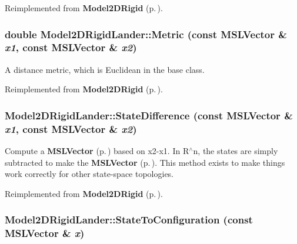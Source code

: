 Reimplemented from {\bf Model2DRigid} {\rm (p.\,\pageref{classModel2DRigid_a4})}.
\subsubsection{\setlength{\rightskip}{0pt plus 5cm}double Model2DRigid\-Lander::Metric (const {\bf MSLVector} \& {\em x1}, const {\bf MSLVector} \& {\em x2})\hspace{0.3cm}{\tt  [virtual]}}\label{classModel2DRigidLander_a7}


A distance metric, which is Euclidean in the base class.



Reimplemented from {\bf Model2DRigid} {\rm (p.\,\pageref{classModel2DRigid_a6})}.
\subsubsection{ Model2DRigid\-Lander::State\-Difference (const {\bf MSLVector} \& {\em x1}, const {\bf MSLVector} \& {\em x2})\hspace{0.3cm}{\tt  [virtual]}}\label{classModel2DRigidLander_a6}


Compute a {\bf MSLVector} {\rm (p.\,\pageref{classMSLVector})} based on x2-x1. In R$^\wedge$n, the states are simply subtracted to make the {\bf MSLVector} {\rm (p.\,\pageref{classMSLVector})}. This method exists to make things work correctly for other state-space topologies.



Reimplemented from {\bf Model2DRigid} {\rm (p.\,\pageref{classModel2DRigid_a5})}.
\subsubsection{ Model2DRigid\-Lander::State\-To\-Configuration (const {\bf MSLVector} \& {\em x})\hspace{0.3cm}{\tt  [virtual]}}\label{classModel2DRigidLander_a2}


